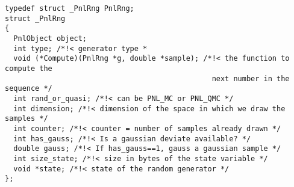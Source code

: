 \begin{lstlisting}
typedef struct _PnlRng PnlRng;
struct _PnlRng
{
  PnlObject object;
  int type; /*!< generator type *
  void (*Compute)(PnlRng *g, double *sample); /*!< the function to compute the
                                                next number in the sequence */
  int rand_or_quasi; /*!< can be PNL_MC or PNL_QMC */
  int dimension; /*!< dimension of the space in which we draw the samples */
  int counter; /*!< counter = number of samples already drawn */
  int has_gauss; /*!< Is a gaussian deviate available? */
  double gauss; /*!< If has_gauss==1, gauss a gaussian sample */
  int size_state; /*!< size in bytes of the state variable */
  void *state; /*!< state of the random generator */
};
\end{lstlisting}


